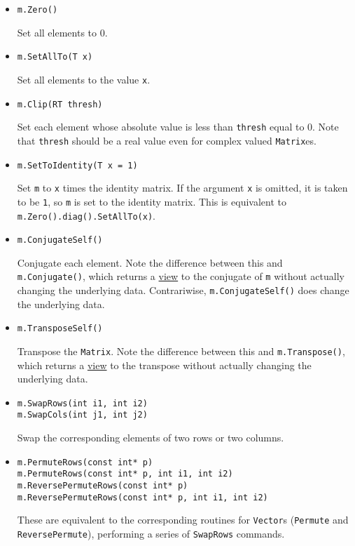 \documentclass[twoside,letterpaper,11pt]{article}
\renewcommand{\tt}[1]{{\texttt {#1}}}
\begin{document}
\begin{itemize}

\item
\begin{verbatim}
m.Zero()
\end{verbatim}
Set all elements to 0.

\item
\begin{verbatim}
m.SetAllTo(T x)
\end{verbatim}
Set all elements to the value \tt{x}.

\item
\begin{verbatim}
m.Clip(RT thresh)
\end{verbatim}
Set each element whose absolute value is less than \tt{thresh} equal to 0.
Note that \tt{thresh} should be a real value even for complex valued
\tt{Matrix}es.

\item
\begin{verbatim}
m.SetToIdentity(T x = 1)
\end{verbatim}
Set \tt{m} to \tt{x} times the identity matrix.
If the argument \tt{x} is omitted, it is 
taken to be \tt{1}, so \tt{m} is set to the identity matrix.
This is equivalent to \tt{m.Zero().diag().SetAllTo(x)}.

\item 
\begin{verbatim}
m.ConjugateSelf()
\end{verbatim}
Conjugate each element.  Note the difference between this and \tt{m.Conjugate()}, 
which returns a \underline{view} to the conjugate of \tt{m} without
actually changing the underlying data.  Contrariwise, \tt{m.ConjugateSelf()}
does change the underlying data.

\item
\begin{verbatim}
m.TransposeSelf()
\end{verbatim}
Transpose the \tt{Matrix}.  Note the difference between this and 
\tt{m.Transpose()}, which returns a \underline{view} to the transpose without 
actually changing the underlying data.

\item
\begin{verbatim}
m.SwapRows(int i1, int i2)
m.SwapCols(int j1, int j2)
\end{verbatim}
Swap the corresponding elements of two rows or two columns.

\item
\begin{verbatim}
m.PermuteRows(const int* p)
m.PermuteRows(const int* p, int i1, int i2)
m.ReversePermuteRows(const int* p)
m.ReversePermuteRows(const int* p, int i1, int i2)
\end{verbatim}
These are equivalent to the corresponding routines for \tt{Vector}s 
(\tt{Permute} and \tt{ReversePermute}), performing a series of \tt{SwapRows} commands.


\end{itemize}
\end{document}
